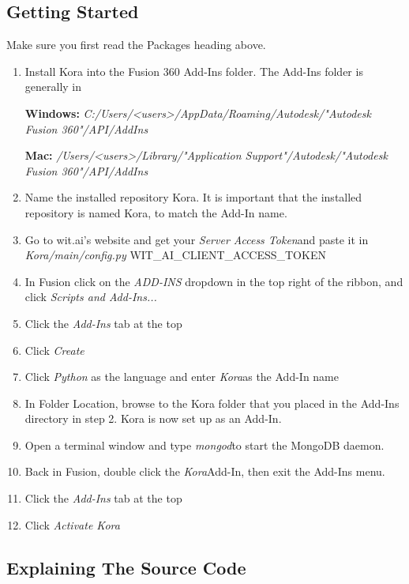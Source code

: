\documentclass[onecolumn, draftclsnofoot,10pt, compsoc]{IEEEtran}
\begin{document}
\subsection{Getting Started}
Make sure you first read the Packages heading above.
	\begin{enumerate}
		\item Install Kora into the Fusion 360 Add-Ins folder.
		The Add-Ins folder is generally in
		
		\textbf{Windows:}
		\textit{C:/Users/<users>/AppData/Roaming/Autodesk/"Autodesk Fusion 360"/API/AddIns}
		
		\textbf{Mac:}
		\textit{/Users/<users>/Library/"Application Support"/Autodesk/"Autodesk Fusion 360"/API/AddIns}
		
		\item Name the installed repository Kora. It is important that the installed repository is named Kora, to match the Add-In name.
		\item  Go to wit.ai's website and get your \textit{Server Access Token}and paste it in \textit{Kora/main/config.py} WIT\_AI\_CLIENT\_ACCESS\_TOKEN
		\item  In Fusion click on the \textit{ADD-INS} dropdown in the top right of the ribbon, and click \textit{Scripts and Add-Ins...}
		\item  Click the \textit{Add-Ins} tab at the top
		\item Click \textit{Create}
		\item  Click \textit{Python} as the language and enter \textit{Kora}as the Add-In name
		\item  In Folder Location, browse to the Kora folder that you placed in the Add-Ins directory in step 2. Kora is now set up as an Add-In.
		\item  Open a terminal window and type \textit{mongod}to start the MongoDB daemon.
		\item  Back in Fusion, double click the \textit{Kora}Add-In, then exit the Add-Ins menu.
		\item  Click the \textit{Add-Ins} tab at the top
		\item  Click \textit{Activate Kora}
	
	\end{enumerate}





\subsection{Explaining The Source Code}
\end{document}

